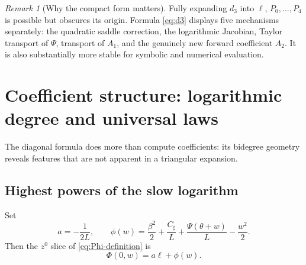 \documentclass[11pt,oneside]{article}
\numberwithin{equation}{section}
\theoremstyle{definition}
\theoremstyle{remark}
\newtheorem{remark}[theorem]{Remark}
\newcommand{\Csharp}{C_{\sharp}}
\begin{document}
\begin{remark}[Why the compact form matters]
Fully expanding $d_3$ into $\ell$, $P_0,\ldots,P_4$ is possible but obscures its origin.  Formula \cref{eq:d3} displays five mechanisms separately: the quadratic saddle correction, the logarithmic Jacobian, Taylor transport of $\Psi$, transport of $A_1$, and the genuinely new forward coefficient $A_2$.  It is also substantially more stable for symbolic and numerical evaluation.
\end{remark}

\section{Coefficient structure: logarithmic degree and universal laws}
\label{sec:structure}

The diagonal formula does more than compute coefficients: its bidegree geometry reveals features that are not apparent in a triangular expansion.

\subsection{Highest powers of the slow logarithm}
Set
\begin{equation}
 a=-\frac1{2L},
 \qquad
 \phi(w)=\frac{\beta^2}{2}+\frac{\Csharp}{L}
 +\frac{\Psi(\theta+w)}L-\frac{w^2}{2}.
 \label{eq:a-phi}
\end{equation}
Then the $z^0$ slice of \cref{eq:Phi-definition} is
\begin{equation}
 \Phi(0,w)=a\ell+\phi(w).
 \label{eq:Phi-zero}
\end{equation}
\end{document}
